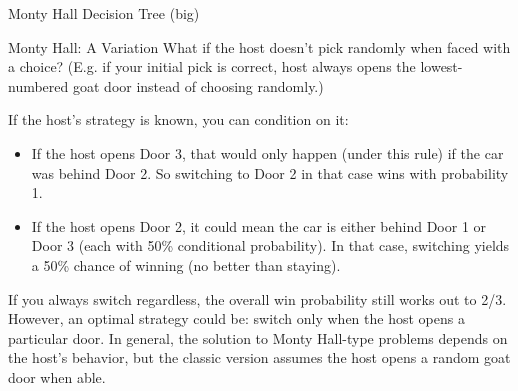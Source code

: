 \documentclass[aspectratio=169,11pt]{beamer} %
\begin{document}
\begin{frame}[fragile]{Monty Hall Decision Tree (big)}
\begin{center}
\end{center}
\end{frame}


\begin{frame}[fragile]{Monty Hall: A Variation}
What if the host doesn't pick randomly when faced with a choice? (E.g. if your initial pick is correct, host always opens the lowest-numbered goat door instead of choosing randomly.) \newline

If the host's strategy is known, you can condition on it:
\begin{itemize}
    \item If the host opens Door 3, that would only happen (under this rule) if the car was behind Door 2. So switching to Door 2 in that case wins with probability 1.
    \item If the host opens Door 2, it could mean the car is either behind Door 1 or Door 3 (each with 50\% conditional probability). In that case, switching yields a 50\% chance of winning (no better than staying).
\end{itemize}

If you always switch regardless, the overall win probability still works out to 2/3. However, an optimal strategy could be: switch only when the host opens a particular door. In general, the solution to Monty Hall-type problems depends on the host's behavior, but the classic version assumes the host opens a random goat door when able.
\end{frame}
\end{document}

